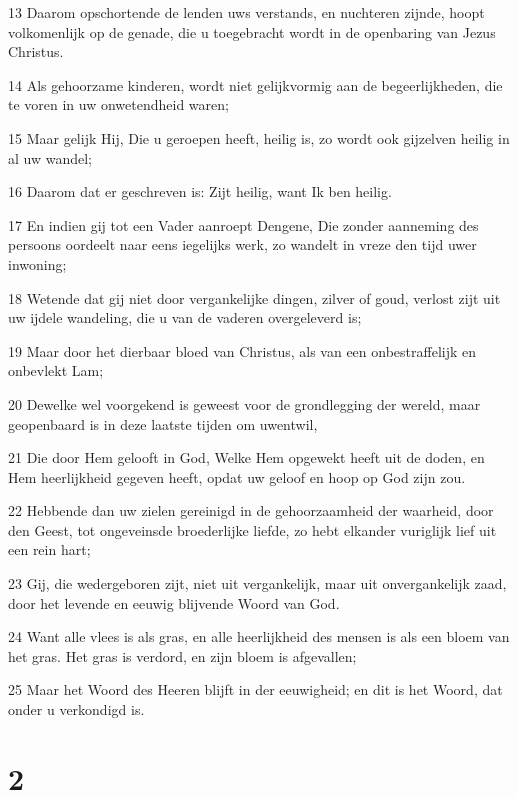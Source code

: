 \par 13 Daarom opschortende de lenden uws verstands, en nuchteren zijnde, hoopt volkomenlijk op de genade, die u toegebracht wordt in de openbaring van Jezus Christus.
\par 14 Als gehoorzame kinderen, wordt niet gelijkvormig aan de begeerlijkheden, die te voren in uw onwetendheid waren;
\par 15 Maar gelijk Hij, Die u geroepen heeft, heilig is, zo wordt ook gijzelven heilig in al uw wandel;
\par 16 Daarom dat er geschreven is: Zijt heilig, want Ik ben heilig.
\par 17 En indien gij tot een Vader aanroept Dengene, Die zonder aanneming des persoons oordeelt naar eens iegelijks werk, zo wandelt in vreze den tijd uwer inwoning;
\par 18 Wetende dat gij niet door vergankelijke dingen, zilver of goud, verlost zijt uit uw ijdele wandeling, die u van de vaderen overgeleverd is;
\par 19 Maar door het dierbaar bloed van Christus, als van een onbestraffelijk en onbevlekt Lam;
\par 20 Dewelke wel voorgekend is geweest voor de grondlegging der wereld, maar geopenbaard is in deze laatste tijden om uwentwil,
\par 21 Die door Hem gelooft in God, Welke Hem opgewekt heeft uit de doden, en Hem heerlijkheid gegeven heeft, opdat uw geloof en hoop op God zijn zou.
\par 22 Hebbende dan uw zielen gereinigd in de gehoorzaamheid der waarheid, door den Geest, tot ongeveinsde broederlijke liefde, zo hebt elkander vuriglijk lief uit een rein hart;
\par 23 Gij, die wedergeboren zijt, niet uit vergankelijk, maar uit onvergankelijk zaad, door het levende en eeuwig blijvende Woord van God.
\par 24 Want alle vlees is als gras, en alle heerlijkheid des mensen is als een bloem van het gras. Het gras is verdord, en zijn bloem is afgevallen;
\par 25 Maar het Woord des Heeren blijft in der eeuwigheid; en dit is het Woord, dat onder u verkondigd is.

\chapter{2}

